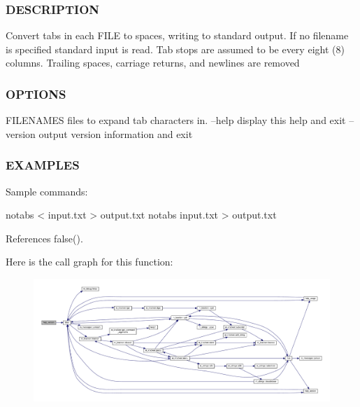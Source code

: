 \subsubsection*{D\+E\+S\+C\+R\+I\+P\+T\+I\+ON}

Convert tabs in each F\+I\+LE to spaces, writing to standard output. If no filename is specified standard input is read. Tab stops are assumed to be every eight (8) columns. Trailing spaces, carriage returns, and newlines are removed

\subsubsection*{O\+P\+T\+I\+O\+NS}

F\+I\+L\+E\+N\+A\+M\+ES files to expand tab characters in. --help display this help and exit --version output version information and exit

\subsubsection*{E\+X\+A\+M\+P\+L\+ES}

\begin{DoxyVerb}    Sample commands:

     notabs < input.txt > output.txt
     notabs input.txt   > output.txt \end{DoxyVerb}
 

References false().

Here is the call graph for this function\+:
\nopagebreak
\begin{figure}[H]
\begin{center}
\leavevmode
\includegraphics[width=350pt]{notabs_8f90_a39c21619b08a3c22f19e2306efd7f766_cgraph}
\end{center}
\end{figure}
\mbox{\label{notabs_8f90_acb31f04c67c279d1a77f3346ad0cf516}} 
